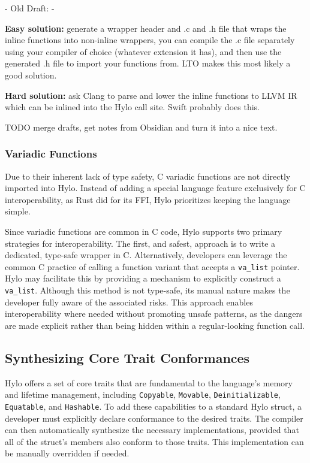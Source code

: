 - Old Draft: - 

\textbf{Easy solution:} generate a wrapper header and .c and .h file that wraps the inline functions into non-inline wrappers, you can compile the .c file separately using your compiler of choice (whatever extension it has), and then use the generated .h file to import your functions from. LTO makes this most likely a good solution.

\textbf{Hard solution:} ask Clang to parse and lower the inline functions to LLVM IR which can be inlined into the Hylo call site. Swift probably does this.

TODO merge drafts, get notes from Obsidian and turn it into a nice text.

\subsubsection{Variadic Functions}
Due to their inherent lack of type safety, C variadic functions are not directly imported into Hylo. Instead of adding a special language feature exclusively for C interoperability, as Rust did for its FFI\cite{rust-variadic-ffi}, Hylo prioritizes keeping the language simple.

Since variadic functions are common in C code, Hylo supports two primary strategies for interoperability. The first, and safest, approach is to write a dedicated, type-safe wrapper in C. Alternatively, developers can leverage the common C practice of calling a function variant that accepts a \texttt{va\_list} pointer\cite{wrapping-valist}. Hylo may facilitate this by providing a mechanism to explicitly construct a \texttt{va\_list}\cite{swift-variadic-ffi}. Although this method is not type-safe, its manual nature makes the developer fully aware of the associated risks. This approach enables interoperability where needed without promoting unsafe patterns, as the dangers are made explicit rather than being hidden within a regular-looking function call.

\subsection{Synthesizing Core Trait Conformances}

Hylo offers a set of core traits that are fundamental to the language's memory and lifetime management, including \texttt{Copyable}, \texttt{Movable}, \texttt{Deinitializable}, \texttt{Equatable}, and \texttt{Hashable}. To add these capabilities to a standard Hylo struct, a developer must explicitly declare conformance to the desired traits. The compiler can then automatically synthesize the necessary implementations, provided that all of the struct's members also conform to those traits. This implementation can be manually overridden if needed.


